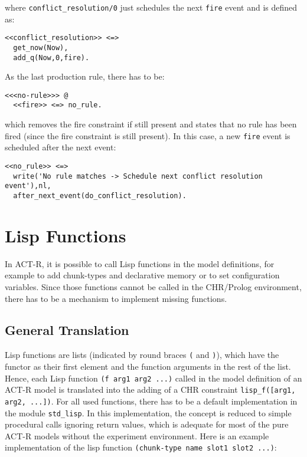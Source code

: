 where \lstinline|conflict_resolution/0| just schedules the next \lstinline|fire| event and is defined as:

\begin{lstlisting}
<<conflict_resolution>> <=> 
  get_now(Now),
  add_q(Now,0,fire).
\end{lstlisting}

As the last production rule, there has to be:

\begin{lstlisting}
<<<no-rule>>> @ 
  <<fire>> <=> no_rule.
\end{lstlisting}

which removes the fire constraint if still present and states that no rule has been fired (since the fire constraint is still present). In this case, a new \lstinline|fire| event is scheduled after the next event:

\begin{lstlisting}
<<no_rule>> <=> 
  write('No rule matches -> Schedule next conflict resolution event'),nl,
  after_next_event(do_conflict_resolution).
\end{lstlisting}

\section{Lisp Functions}
\label{lisp_functions}

In ACT-R, it is possible to call Lisp functions in the model definitions, for example to add chunk-types and declarative memory or to set configuration variables. Since those functions cannot be called in the CHR/Prolog environment, there has to be a mechanism to implement missing functions.

\subsection{General Translation}

Lisp functions are lists (indicated by round braces \lstinline|(| and \lstinline|)|), which have the functor as their first element and the function arguments in the rest of the list. Hence, each Lisp function \lstinline|(f arg1 arg2 ...)| called in the model definition of an ACT-R model is translated into the adding of a CHR constraint \lstinline|lisp_f([arg1, arg2, ...])|. For all used functions, there has to be a default implementation in the module \lstinline|std_lisp|. In this implementation, the concept is reduced to simple procedural calls ignoring return values, which is adequate for most of the pure ACT-R models without the experiment environment. Here is an example implementation of the lisp function \lstinline|(chunk-type name slot1 slot2 ...)|:


